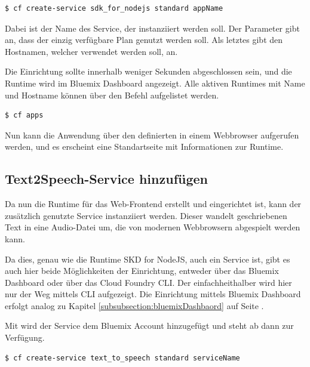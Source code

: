 \begin{lstlisting}[language=bash, caption=Provisionieren des SDK for NodeJS Services, label=Provisionieren des SDK for NodeJS Services]
   $ cf create-service sdk_for_nodejs standard appName
\end{lstlisting}

Dabei ist  der Name des Service, der instanziiert werden soll. Der Parameter  gibt an,
dass der einzig verfügbare Plan genutzt werden soll. Als letztes gibt  den Hostnamen, welcher verwendet
werden soll, an.

Die Einrichtung sollte innerhalb weniger Sekunden abgeschlossen sein, und die Runtime wird im Bluemix Dashboard angezeigt.
Alle aktiven Runtimes mit Name und Hostname können über den Befehl  aufgelistet werden.

\begin{lstlisting}[language=bash, caption=Auflisten aller Applikationen, label=Auflisten aller Applikationen]
   $ cf apps
\end{lstlisting}

Nun kann die Anwendung über den definierten  in einem Webbrowser aufgerufen werden, und es erscheint eine
Standartseite mit Informationen zur Runtime.

\subsection{Text2Speech-Service hinzufügen}
Da nun die Runtime für das Web-Frontend erstellt und eingerichtet ist, kann der zusätzlich genutzte Service 
instanziiert werden. Dieser wandelt geschriebenen Text in eine Audio-Datei um, die von modernen Webbrowsern abgespielt
werden kann.

Da dies, genau wie die Runtime SKD for NodeJS, auch ein Service ist, gibt es auch hier beide Möglichkeiten der Einrichtung,
entweder über das Bluemix Dashboard oder über das Cloud Foundry CLI. Der einfachheithalber wird hier nur der Weg mittels
CLI aufgezeigt. Die Einrichtung mittels Bluemix Dashboard erfolgt analog zu Kapitel \ref{subsubsection:bluemixDashbaord}
auf Seite \pageref{subsubsection:bluemixDashbaord}.

Mit  wird der Service dem Bluemix Account hinzugefügt und steht ab dann zur Verfügung.

\begin{lstlisting}[language=bash, caption=Provisionieren des Text2Speech Services, label=Provisionieren des Text2Speech Services]
   $ cf create-service text_to_speech standard serviceName
\end{lstlisting}

